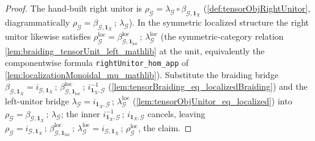\begin{proof}
  The hand-built right unitor is \(\rho_{\mathcal{G}} = \lambda_{\mathcal{G}}
  \circ \beta_{\mathcal{G},\mathbf{1}_X}\) (\cref{def:tensorObjRightUnitor},
  diagrammatically \(\rho_{\mathcal{G}} = \beta_{\mathcal{G},\mathbf{1}_X}\,;\,
  \lambda_{\mathcal{G}}\)). In the symmetric localized structure the right unitor
  likewise satisfies \(\rho^{\mathrm{loc}}_{\mathcal{G}} =
  \beta^{\mathrm{loc}}_{\mathcal{G},\mathbf{1}_{\mathrm{loc}}}\,;\,
  \lambda^{\mathrm{loc}}_{\mathcal{G}}\) (the symmetric-category relation
  \cref{lem:braiding_tensorUnit_left_mathlib} at the unit, equivalently the
  componentwise formula \texttt{rightUnitor\_hom\_app} of
  \cref{lem:localizationMonoidal_mu_mathlib}). Substitute the braiding bridge
  \(\beta_{\mathcal{G},\mathbf{1}_X} = i_{\mathcal{G},\mathbf{1}_X}\,;\,
  \beta^{\mathrm{loc}}_{\mathcal{G},\mathbf{1}_{\mathrm{loc}}}\,;\,
  i_{\mathbf{1}_X,\mathcal{G}}^{-1}\)
  (\cref{lem:tensorBraiding_eq_localizedBraiding}) and the left-unitor bridge
  \(\lambda_{\mathcal{G}} = i_{\mathbf{1}_X,\mathcal{G}}\,;\,
  \lambda^{\mathrm{loc}}_{\mathcal{G}}\)
  (\cref{lem:tensorObjUnitor_eq_localized}) into
  \(\rho_{\mathcal{G}} = \beta_{\mathcal{G},\mathbf{1}_X}\,;\,
  \lambda_{\mathcal{G}}\); the inner
  \(i_{\mathbf{1}_X,\mathcal{G}}^{-1}\,;\, i_{\mathbf{1}_X,\mathcal{G}}\) cancels,
  leaving \(\rho_{\mathcal{G}} = i_{\mathcal{G},\mathbf{1}_X}\,;\,
  \beta^{\mathrm{loc}}_{\mathcal{G},\mathbf{1}_{\mathrm{loc}}}\,;\,
  \lambda^{\mathrm{loc}}_{\mathcal{G}} = i_{\mathcal{G},\mathbf{1}_X}\,;\,
  \rho^{\mathrm{loc}}_{\mathcal{G}}\), the claim.
\end{proof}

